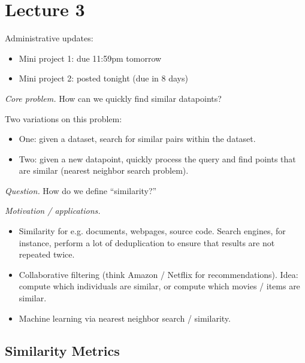 

%

\maketitle
\tableofcontents

\section{Lecture 3}

Administrative updates:
\begin{itemize}
  \item Mini project 1: due 11:59pm tomorrow
  \item Mini project 2: posted tonight (due in 8 days)
\end{itemize}


{\it Core problem.} How can we quickly find similar datapoints?

Two variations on this problem:

\begin{itemize}
  \item One: given a dataset, search for similar pairs within the dataset.
  \item Two: given a new datapoint, quickly process the query and find points that are similar (nearest neighbor search problem).
\end{itemize}

{\it Question.} How do we define ``similarity?''

{\it Motivation / applications.}
\begin{itemize}
  \item Similarity for e.g. documents, webpages, source code.  Search engines, for instance, perform a lot of deduplication to ensure that results are not repeated twice.
  \item Collaborative filtering (think Amazon / Netflix for recommendations).  Idea: compute which individuals are similar, or compute which movies / items are similar.
  \item Machine learning via nearest neighbor search / similarity.
\end{itemize}

\subsection{Similarity Metrics}

